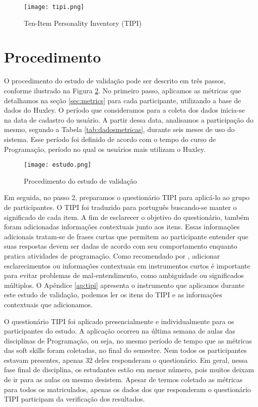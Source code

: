 \begin{figure}[ht]
\centering
\caption{\small Ten-Item Personality Inventory (TIPI)}
\texttt{[image: tipi.png]}
\label{fig:tipi}
\end{figure}

\section{Procedimento}
\label{sec:procedimento}

O procedimento do estudo de validação pode ser descrito em três passos, conforme ilustrado na Figura \ref{fig:estudo}.
No primeiro passo, aplicamos as métricas que detalhamos na seção \ref{sec:metrics} para cada participante, utilizando a base de dados do Huxley. O período que consideramos para a coleta dos dados inicia-se na data de cadastro do usuário. A partir dessa data, analisamos a participação do mesmo, segundo a Tabela \ref{tab:dadosmetricas}, durante seis meses de uso do sistema. Esse período foi definido de acordo com o tempo do curso de Programação, período no qual os usuários mais utilizam o Huxley.%

\begin{figure}[ht]
\centering
\caption{\small Procedimento do estudo de validação} 
\texttt{[image: estudo.png]}
\label{fig:estudo}
\end{figure}

Em seguida, no passo 2, preparamos o questionário TIPI para aplicá-lo ao grupo de participantes. O TIPI foi traduzido para português buscando-se manter o significado de cada item. A fim de esclarecer o objetivo do questionário, também foram adicionadas informações contextuais junto aos itens. Essas informações adicionais tratam-se de frases curtas que permitem ao participante entender que suas respostas devem ser dadas de acordo com seu comportamento enquanto pratica atividades de programação. Como recomendado por \cite{john:99}, adicionar esclarecimentos ou informações contextuais em instrumentos curtos é importante para evitar problemas de mal-entendimento, como ambiguidade ou significados múltiplos.
O Apêndice \ref{ap:tipi} apresenta o instrumento que aplicamos durante este estudo de validação, podemos ler os itens do TIPI e as informações contextuais que adicionamos.

O questionário TIPI foi aplicado presencialmente e individualmente para os participantes do estudo. A aplicação ocorreu na última semana de aulas das disciplinas de Programação, ou seja, no mesmo período de tempo que as métricas das soft skills foram coletadas, no final do semestre. Nem todos os participantes estavam presentes, apenas 32 deles responderam o questionário. Em geral, nessa fase final de disciplina, os estudantes estão em menor número, pois muitos deixam de ir para as aulas ou mesmo desistem. Apesar de termos coletado as métricas para todos os matriculados, apenas os dados dos que responderam o questionário TIPI participam da verificação dos resultados.

